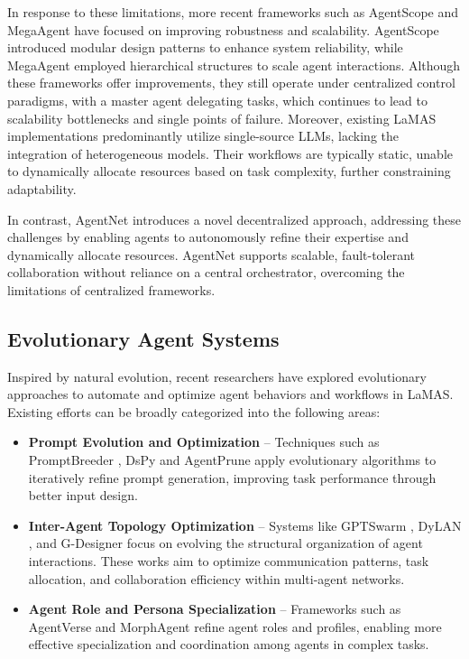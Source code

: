 \documentclass{article}
\begin{document}
In response to these limitations, more recent frameworks such as AgentScope \citep{gao2024agentscopeflexiblerobustmultiagent} and MegaAgent \citep{wang2024megaagent} have focused on improving robustness and scalability. AgentScope introduced modular design patterns to enhance system reliability, while MegaAgent employed hierarchical structures to scale agent interactions. Although these frameworks offer improvements, they still operate under centralized control paradigms, with a master agent delegating tasks, which continues to lead to scalability bottlenecks and single points of failure. Moreover, existing LaMAS implementations predominantly utilize single-source LLMs, lacking the integration of heterogeneous models. Their workflows are typically static, unable to dynamically allocate resources based on task complexity, further constraining adaptability.

In contrast, AgentNet introduces a novel decentralized approach, addressing these challenges by enabling agents to autonomously refine their expertise and dynamically allocate resources. AgentNet supports scalable, fault-tolerant collaboration without reliance on a central orchestrator, overcoming the limitations of centralized frameworks.

\subsection{Evolutionary Agent Systems}
Inspired by natural evolution, recent researchers have explored evolutionary approaches to automate and optimize agent behaviors and workflows in LaMAS. Existing efforts can be broadly categorized into the following areas:

\vspace{-0.1cm}
\begin{itemize}[itemsep=0em]
    \item \textbf{Prompt Evolution and Optimization} – Techniques such as PromptBreeder \citep{fernando2023promptbreeder}, DsPy \citep{khattab2023dspy} and AgentPrune \citep{zhang2024cutcrapeconomicalcommunication} apply evolutionary algorithms to iteratively refine prompt generation, improving task performance through better input design.
    \item \textbf{Inter-Agent Topology Optimization} – Systems like GPTSwarm \citep{zhuge2024gptswarm}, DyLAN \citep{liu2024dynamicllmpoweredagentnetwork}, and G-Designer \citep{zhang2024g} focus on evolving the structural organization of agent interactions. These works aim to optimize communication patterns, task allocation, and collaboration efficiency within multi-agent networks.
    \item \textbf{Agent Role and Persona Specialization} – Frameworks such as AgentVerse and MorphAgent \citep{chen2023agentverse,lu2024morphagent} refine agent roles and profiles, enabling more effective specialization and coordination among agents in complex tasks.
\end{itemize}
\end{document}
